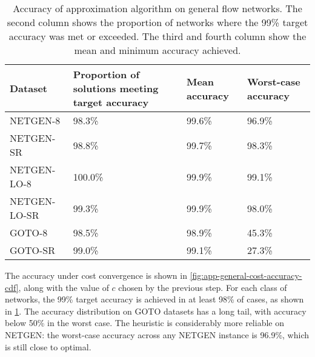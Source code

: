 \begin{table}
    \centering
    \begin{tabular}{l|p{}p{}p{}}
        \textbf{Dataset} & \textbf{Proportion of solutions meeting target accuracy} & \textbf{Mean accuracy} & \textbf{Worst-case accuracy} \tabularnewline
        \hline
        NETGEN-8 & 98.3\% & 99.6\% & 96.9\% \tabularnewline
        NETGEN-SR & 98.8\% & 99.7\% & 98.3\% \tabularnewline
        NETGEN-LO-8 & 100.0\% & 99.9\% & 99.1\% \tabularnewline
        NETGEN-LO-SR & 99.3\% & 99.9\% & 98.0\% \tabularnewline
        GOTO-8 & 98.5\% & 98.9\% & 45.3\% \tabularnewline
        GOTO-SR & 99.0\% & 99.1\% & 27.3\% \tabularnewline
    \end{tabular}
    \caption[Accuracy of approximation algorithm on general flow networks]{Accuracy of approximation algorithm on general flow networks. The second column shows the proportion of networks where the 99\% target accuracy was met or exceeded. The third and fourth column show the mean and minimum accuracy achieved.}
    \label{table:app-general-accuracy}
\end{table}

The accuracy under cost convergence is shown in \cref{fig:app-general-cost-accuracy-cdf}, along with the value of $c$ chosen by the previous step. For each class of networks, the 99\% target accuracy is achieved in at least 98\% of cases, as shown in \cref{table:app-general-accuracy}. The accuracy distribution on GOTO datasets has a long tail, with accuracy below 50\% in the worst case. The heuristic is considerably more reliable on NETGEN: the worst-case accuracy across any NETGEN instance is 96.9\%, which is still close to optimal.

